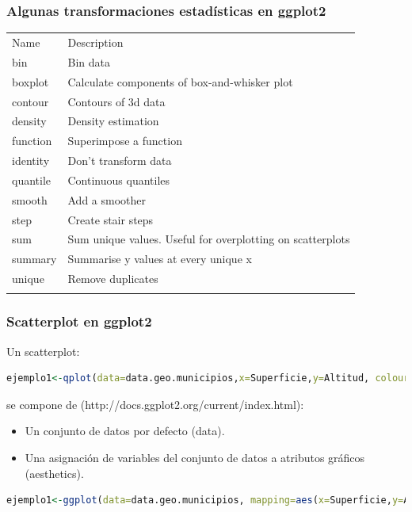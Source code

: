 \documentclass[8pt,ignorenonframetext,]{beamer}
\begin{document}
\begin{frame}\frametitle{Algunas transformaciones estadísticas en
ggplot2}

\begin{longtable}[c]{@{}ll@{}}
\hline\noalign{\medskip}
Name & Description
\\\noalign{\medskip}
\hline\noalign{\medskip}
bin & Bin data
\\\noalign{\medskip}
boxplot & Calculate components of box-and-whisker plot
\\\noalign{\medskip}
contour & Contours of 3d data
\\\noalign{\medskip}
density & Density estimation
\\\noalign{\medskip}
function & Superimpose a function
\\\noalign{\medskip}
identity & Don't transform data
\\\noalign{\medskip}
quantile & Continuous quantiles
\\\noalign{\medskip}
smooth & Add a smoother
\\\noalign{\medskip}
step & Create stair steps
\\\noalign{\medskip}
sum & Sum unique values. Useful for overplotting on scatterplots
\\\noalign{\medskip}
summary & Summarise y values at every unique x
\\\noalign{\medskip}
unique & Remove duplicates
\\\noalign{\medskip}
\hline
\end{longtable}

\end{frame}

\begin{frame}[fragile]\frametitle{Scatterplot en ggplot2}

Un scatterplot:

\begin{lstlisting}[language=R]
ejemplo1<-qplot(data=data.geo.municipios,x=Superficie,y=Altitud, colour = Isla)
\end{lstlisting}

se compone de (http://docs.ggplot2.org/current/index.html):

\begin{itemize}
\item
  Un conjunto de datos por defecto (data).
\item
  Una asignación de variables del conjunto de datos a atributos gráficos
  (aesthetics).
\end{itemize}

\begin{lstlisting}[language=R]
ejemplo1<-ggplot(data=data.geo.municipios, mapping=aes(x=Superficie,y=Altitud, colour=Isla))
\end{lstlisting}

\end{frame}
\end{document}
